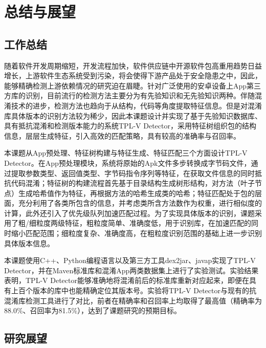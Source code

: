 \chapter{总结与展望}

\section{工作总结}
随着软件开发周期缩短，开发流程加快，软件供应链中开源软件包高重用趋势日益增长，上游软件生态系统受到污染，将会使得下游产品处于安全隐患之中，因此，能够精确检测上游依赖情况的研究迫在眉睫。针对广泛使用的安卓设备上App第三方库的识别，目前流行的检测方法主要分为有先验知识和无先验知识两种。伴随混淆技术的进步，检测方法也趋向于从结构，代码等角度提取特征信息。但是对混淆库具体版本的识别方法较为稀少，因此本课题设计并实现了基于先验知识数据库、具有抵抗混淆和检测版本能力的系统TPL-V Detector，采用特征树组织包的结构信息，层层生成特征，引入高效的匹配策略，具有较高的准确率与召回率。


本课题从App预处理、特征树构建与特征生成、特征匹配三个方面设计TPL-V Detector。在App预处理模块，系统将原始的Apk文件多步转换成字节码文件，通过提取参数类型、返回值类型、字节码指令序列等特征，在获取文件信息的同时抵抗代码混淆；特征树的构建流程首先基于目录结构生成树形结构，对方法（叶子节点）生成哈希值作为特征，再根据方法的哈希生成类的哈希；特征匹配处于包的层面，充分利用了各类所包含的信息，并考虑类所含方法数作为权重，进行相似度的计算，此外还引入了优先级队列加速匹配过程。为了实现具体版本的识别，课题采用了粗/细粒度两级特征，粗粒度简单、准确度低，用于识别库，在加速匹配的同时缩小匹配范围；细粒度复杂、准确度高，在粗粒度识别范围的基础上进一步识别具体版本信息。


本课题使用C++、Python编程语言以及第三方工具dex2jar、javap实现了TPL-V Detector，并在Maven标准库和混淆App两类数据集上进行了实验测试。实验结果表明，TPL-V Detector能够准确地将混淆前后的标准库重新对应起来，即便在具有上百个版本的库中也能精确定位其版本号。实验将TPL-V Detector与现有的抗混淆库检测工具进行了对比，前者在精确率和召回率上均取得了最高值（精确率为88.0\%、召回率为81.5\%），达到了课题研究的预期目标。


\section{研究展望}

